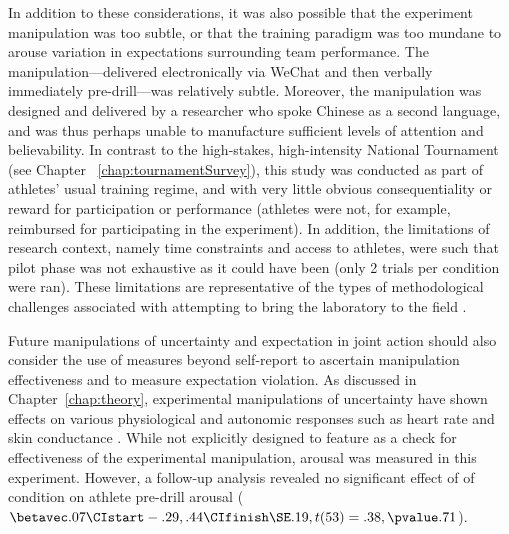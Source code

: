 \begin{CJK}{UTF8}{gbsn}
In addition to these considerations, it was also possible that the experiment manipulation was too subtle, or that the training paradigm was too mundane to arouse variation in expectations surrounding team performance.  The manipulation---delivered electronically via WeChat and then verbally immediately pre-drill—was relatively subtle.  Moreover, the manipulation was designed and delivered by a researcher who spoke Chinese as a second language, and was thus perhaps unable to manufacture sufficient levels of attention and believability.  In contrast to the high-stakes, high-intensity National Tournament (see Chapter ~\ref{chap:tournamentSurvey}), this study was conducted as part of athletes' usual training regime, and with very little obvious consequentiality or reward for participation or performance (athletes were not, for example,  reimbursed for participating in the experiment).  In addition, the limitations of research context, namely time constraints and access to athletes, were such that pilot phase was not exhaustive as it could have been (only 2 trials per condition were ran).  These limitations are representative of the types of methodological challenges associated with attempting to bring the laboratory to the field \citep{Xygalatas2013}.


Future manipulations of uncertainty and expectation in joint action should also consider the use of measures beyond self-report to ascertain manipulation effectiveness and to measure expectation violation.  As discussed in Chapter~\ref{chap:theory}, experimental manipulations of uncertainty have shown effects on various physiological and autonomic responses such as heart rate \citep{Averill1972} and skin conductance \citep{Epstein1970}. While not explicitly designed to feature as a check for effectiveness of the experimental manipulation, arousal was measured in this experiment.  However,  a follow-up analysis revealed no significant effect of of condition on athlete pre-drill arousal  ($\betavec .07 \CIstart -.29, .44 \CIfinish \SE .19, t(53)= .38, \pvalue .71$).


\end{CJK}
